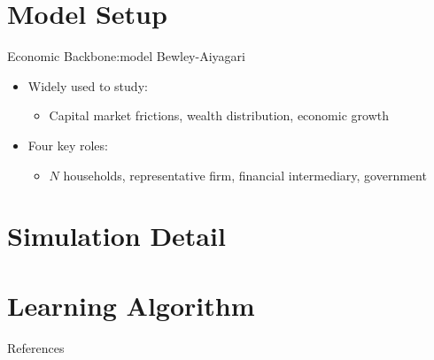 \documentclass{beamer}
\begin{document}
\section{Model Setup}
\begin{frame}{Economic Backbone:model Bewley-Aiyagari}
  \begin{itemize}
    \item Widely used to study:
    \begin{itemize}
      \item Capital market frictions, wealth distribution, economic growth
    \end{itemize}
    \item Four key roles:
    \begin{itemize}
      \item $N$ households, representative firm, financial intermediary, government
    \end{itemize}
  \end{itemize}
\end{frame}

\section{Simulation Detail}

\section{Learning Algorithm}

\begin{frame}[allowframebreaks]{References}
    \nocite{*}
    \printbibliography
\end{frame}
\end{document}
